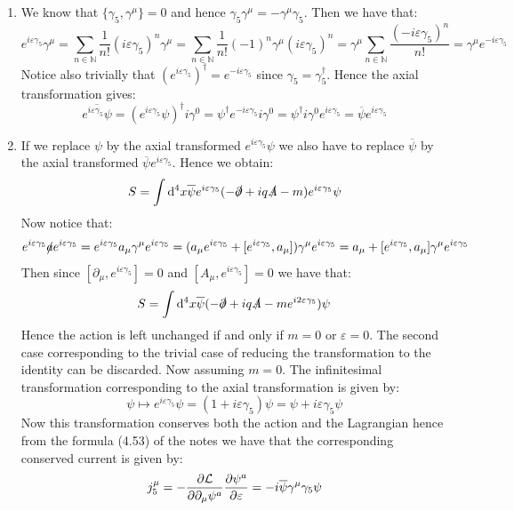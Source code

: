 \documentclass[10pt,a4paper]{article}
\begin{document}
\begin{enumerate}

\item We know that $\{\gamma_5, \gamma^\mu\} = 0$ and hence $\gamma_5 \gamma^\mu = - \gamma^\mu \gamma_5$. Then we have that:
\[
e^{i \varepsilon \gamma_5} \gamma^\mu = \sum_{n \in \mathbb{N}} \frac{1}{n!} (i \varepsilon \gamma_5)^n \gamma^\mu = \sum_{n \in \mathbb{N}} \frac{1}{n!} (-1)^n \gamma^\mu (i \varepsilon \gamma_5)^n  = \gamma^\mu \sum_{n \in \mathbb{N}} \frac{(-i \varepsilon \gamma_5)^n}{n!} = \gamma^\mu e^{- i \varepsilon \gamma_5}
\]
Notice also trivially that $(e^{i \varepsilon\gamma_5})^\dagger = e^{- i \varepsilon \gamma_5}$ since $\gamma_5 = \gamma_5^\dagger$. Hence the axial transformation gives:
\[
\overline{e^{i \varepsilon \gamma_5}\psi} = (e^{i\varepsilon \gamma_5} \psi)^\dagger i \gamma^0 = \psi^\dagger e^{- i \varepsilon \gamma_5} i \gamma^0 = \psi^\dagger i \gamma^0 e^{i\varepsilon \gamma_5} = \overline{\psi} e^{i \varepsilon \gamma_5}
\]

\item If we replace $\psi$ by the axial transformed $e^{i \varepsilon \gamma_5} \psi$ we also have to replace $\overline{\psi}$ by the axial transformed $\overline{\psi} e^{i \varepsilon \gamma_5}$. Hence we obtain:
\[
S = \int \dd^4 x \overline{\psi} e^{i \varepsilon\gamma_5} (- \slashed{\partial}  + i q \slashed{A} - m) e^{i\varepsilon\gamma_5} \psi
\]
Now notice that:
\[
e^{i\varepsilon\gamma_5} \slashed{a} e^{i\varepsilon \gamma_5} = e^{i\varepsilon \gamma_5} a_\mu \gamma^\mu e^{i\varepsilon \gamma_5} = (a_\mu e^{i\varepsilon \gamma_5} + [e^{i\varepsilon \gamma_5}, a_\mu]) \gamma^\mu e^{i\varepsilon \gamma_5} = a_\mu + [e^{i\varepsilon \gamma_5}, a_\mu] \gamma^\mu e^{i\varepsilon \gamma_5}
\]
Then since $[\partial_\mu, e^{i\varepsilon \gamma_5}] = 0$ and $[A_\mu, e^{i\varepsilon \gamma_5}] = 0$ we have that:
\[
S = \int \dd^4 x \overline{\psi}(-\slashed{\partial} + i q \slashed{A} - m e^{i2\varepsilon \gamma_5}) \psi
\]
Hence the action is left unchanged if and only if $m = 0$ or $\varepsilon = 0$. The second case corresponding to the trivial case of reducing the transformation to the identity can be discarded. Now assuming $m = 0$. The infinitesimal transformation corresponding to the axial transformation is given by:
\[
\psi \longmapsto e^{i \varepsilon \gamma_5} \psi = (1 + i \varepsilon \gamma_5) \psi = \psi + i\varepsilon \gamma_5 \psi
\]
Now this transformation conserves both the action and the Lagrangian hence from the formula (4.53) of the notes we have that the corresponding conserved current is given by:
\[
j_5^\mu = - \pdv{\mathcal{L}}{\partial_\mu \psi^a}\pdv{\psi^a}{\varepsilon} = - i \overline{\psi} \gamma^\mu  \gamma_5 \psi 
\]


\end{enumerate}
\end{document}
